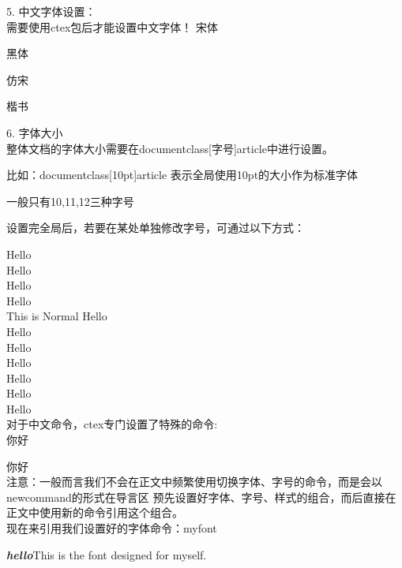 \documentclass{article}
\newcommand{\myfont}{\textbf{\textit{hello}}}
\begin{document}
    5. 中文字体设置：\\

    需要使用ctex包后才能设置中文字体！
    {\songti 宋体}

    {\heiti 黑体}

    {\fangsong 仿宋}

    {\kaishu 楷书}

    6. 字体大小\\

    整体文档的字体大小需要在documentclass[字号]{article}中进行设置。

    比如：documentclass[10pt]{article} 表示全局使用10pt的大小作为标准字体

    一般只有10,11,12三种字号

    设置完全局后，若要在某处单独修改字号，可通过以下方式：
    
    {\tiny          Hello}\\
    {\scriptsize    Hello}\\
    {\footnotesize  Hello}\\
    {\small         Hello}\\

    This is Normal Hello\\

    {\normalsize    Hello}\\
    {\large         Hello}\\
    {\Large         Hello}\\
    {\LARGE         Hello}\\
    {\huge          Hello}\\
    {\Huge          Hello}\\

    对于中文命令，ctex专门设置了特殊的命令:\\

    {   你好}

    {  你好}\\

    注意：一般而言我们不会在正文中频繁使用切换字体、字号的命令，而是会以newcommand的形式在导言区
    预先设置好字体、字号、样式的组合，而后直接在正文中使用新的命令引用这个组合。\\

    现在来引用我们设置好的字体命令：myfont

    \myfont{This is the font designed for myself.}
\end{document}

